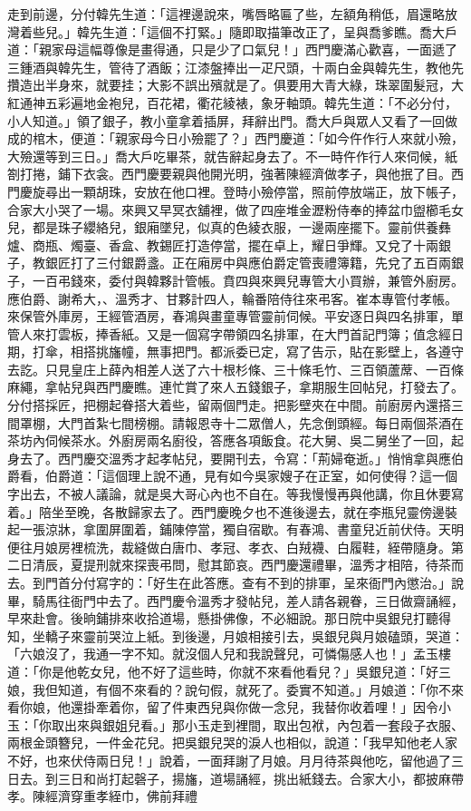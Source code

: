 \begin{showcontents}{}
走到前邊，分付韓先生道：「這裡邊說來，嘴唇略匾了些，左額角稍低，眉還略放灣着些兒。」韓先生道：「這個不打緊。」隨即取描筆改正了，呈與喬爹瞧。喬大戶道：「親家母這幅尊像是畫得通，只是少了口氣兒！」西門慶滿心歡喜，一面遞了三鍾酒與韓先生，管待了酒飯；江漆盤捧出一疋尺頭，十兩白金與韓先生，教他先攢造出半身來，就要挂；大影不誤出殯就是了。俱要用大青大綠，珠翠圍髮冠，大紅通神五彩遍地金袍兒，百花裙，衢花綾裱，象牙軸頭。韓先生道：「不必分付，小人知道。」領了銀子，教小童拿着插屏，拜辭出門。喬大戶與眾人又看了一回做成的棺木，便道：「親家母今日小殮罷了？」西門慶道：「如今仵作行人來就小殮，大殮還等到三日。」喬大戶吃畢茶，就告辭起身去了。不一時仵作行人來伺候，紙劄打捲，鋪下衣衾。西門慶要親與他開光明，強著陳經濟做孝子，與他抿了目。西門慶旋尋出一顆胡珠，安放在他口裡。登時小殮停當，照前停放端正，放下帳子，合家大小哭了一場。來興又早冥衣舖裡，做了四座堆金瀝粉侍奉的捧盆巾盥櫛毛女兒，都是珠子纓絡兒，銀廂墜兒，似真的色綾衣服，一邊兩座擺下。靈前供養彝爐、商瓶、燭臺、香盒、教錫匠打造停當，擺在卓上，耀日爭輝。又兌了十兩銀子，教銀匠打了三付銀爵盞。正在廂房中與應伯爵定管喪禮簿籍，先兌了五百兩銀子，一百弔錢來，委付與韓夥計管帳。賁四與來興兒專管大小買辦，兼管外廚房。應伯爵、謝希大，、溫秀才、甘夥計四人，輪番陪侍往來弔客。崔本專管付孝帳。來保管外庫房，王經管酒房，春鴻與畫童專管靈前伺候。平安逐日與四名排軍，單管人來打雲板，捧香紙。又是一個寫字帶領四名排軍，在大門首記門簿；值念經日期，打傘，相搭挑旛幢，無事把門。都派委已定，寫了告示，貼在影壁上，各遵守去訖。只見皇庄上薛內相差人送了六十根杉條、三十條毛竹、三百領蘆蓆、一百條麻繩，拿帖兒與西門慶瞧。連忙賞了來人五錢銀子，拿期服生回帖兒，打發去了。分付搭採匠，把棚起眷搭大着些，留兩個門走。把影壁夾在中間。前廚房內還搭三間罩棚，大門首紮七間榜棚。請報恩寺十二眾僧人，先念倒頭經。每日兩個茶酒在茶坊內伺候茶水。外廚房兩名廚役，答應各項飯食。花大舅、吳二舅坐了一回，起身去了。西門慶交溫秀才起孝帖兒，要開刊去，令寫：「荊婦奄逝。」悄悄拿與應伯爵看，伯爵道：「這個理上說不通，見有如今吳家嫂子在正室，如何使得？這一個字出去，不被人議論，就是吳大哥心內也不自在。等我慢慢再與他講，你且休要寫着。」陪坐至晚，各散歸家去了。西門慶晚夕也不進後邊去，就在李瓶兒靈傍邊裝起一張涼牀，拿圍屏圍着，鋪陳停當，獨自宿歇。有春鴻、書童兒近前伏侍。天明便往月娘房裡梳洗，裁縫做白唐巾、孝冠、孝衣、白羢襪、白履鞋，絰帶隨身。第二日清辰，夏提刑就來探喪弔問，慰其節哀。西門慶還禮畢，溫秀才相陪，待茶而去。到門首分付寫字的：「好生在此答應。查有不到的排軍，呈來衙門內懲治。」說畢，騎馬往衙門中去了。西門慶令溫秀才發帖兒，差人請各親眷，三日做齋誦經，早來赴會。後晌鋪排來收拾道場，懸掛佛像，不必細說。那日院中吳銀兒打聽得知，坐轎子來靈前哭泣上紙。到後邊，月娘相接引去，吳銀兒與月娘磕頭，哭道：「六娘沒了，我通一字不知。就沒個人兒和我說聲兒，可憐傷感人也！」孟玉樓道：「你是他乾女兒，他不好了這些時，你就不來看他看兒？」吳銀兒道：「好三娘，我但知道，有個不來看的？說句假，就死了。委實不知道。」月娘道：「你不來看你娘，他還掛牽着你，留了件東西兒與你做一念兒，我替你收着哩！」因令小玉：「你取出來與銀姐兒看。」那小玉走到裡間，取出包袱，內包着一套段子衣服、兩根金頭簪兒，一件金花兒。把吳銀兒哭的淚人也相似，說道：「我早知他老人家不好，也來伏侍兩日兒！」說着，一面拜謝了月娘。月月待茶與他吃，留他過了三日去。到三日和尚打起磬子，揚旛，道場誦經，挑出紙錢去。合家大小，都披麻帶孝。陳經濟穿重孝絰巾，佛前拜禮
\end{showcontents}
